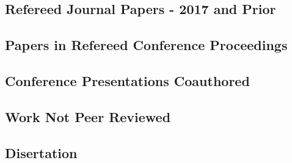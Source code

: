 \documentclass[11pt,a4paper,]{moderncv}
\begin{document}
\hypertarget{refs_journals2018}{}

\vspace{7mm}

\hypertarget{refereed-journal-papers---2017-and-prior}{%
\subsection{\texorpdfstring{\textbf{Refereed Journal Papers - 2017 and
Prior}}{Refereed Journal Papers - 2017 and Prior}}\label{refereed-journal-papers---2017-and-prior}}

\hypertarget{refs_journals2017}{}

\clearpage

\hypertarget{papers-in-refereed-conference-proceedings}{%
\subsection{\texorpdfstring{\textbf{Papers in Refereed Conference
Proceedings}}{Papers in Refereed Conference Proceedings}}\label{papers-in-refereed-conference-proceedings}}

\hypertarget{refs_proceedings}{}

\vspace{7mm}

\hypertarget{conference-presentations-coauthored}{%
\subsection{\texorpdfstring{\textbf{Conference Presentations
Coauthored}}{Conference Presentations Coauthored}}\label{conference-presentations-coauthored}}

\hypertarget{refs_confco}{}

\vspace{7mm}

\hypertarget{work-not-peer-reviewed}{%
\subsection{\texorpdfstring{\textbf{Work Not Peer
Reviewed}}{Work Not Peer Reviewed}}\label{work-not-peer-reviewed}}

\hypertarget{refs_notpeer}{}

\vspace{7mm}

\hypertarget{disertation}{%
\subsection{\texorpdfstring{\textbf{Disertation}}{Disertation}}\label{disertation}}
\end{document}
